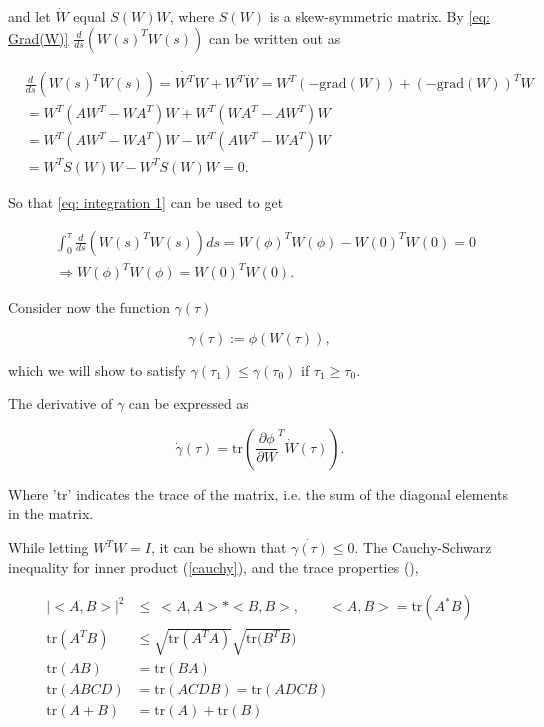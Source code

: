 and let $\dot{W}$ equal $S(W)W$, where $S(W)$ is a skew-symmetric matrix.
By \cref{eq: Grad(W)} $\frac{d}{ds} \left(W(s)^{T}W(s)\right)$ can be written out as 
 
 
\begin{equation}
 \label{eq: Div WtW}
 \begin{split}
  &\frac{d}{ds} (W(s)^{T}W(s))=\dot{W^{T}}W+W^{T}\dot{W}=W^{T}(-\text{grad}(W))+(-\text{grad}(W))^{T}W \\
  &=W^{T}(AW^{T}-WA^{T})W+W^{T}(WA^T-AW^T)W\\
  &=W^{T}(AW^{T}-WA^{T})W-W^{T}(AW^T-WA^{T})W\\
  &=W^{T}S(W)W-W^{T}S(W)W=0.
 \end{split}
\end{equation}

So that \cref{eq: integration 1} can be used to get
 
\begin{equation}
 \label{eq: Verifiy 1}
 \begin{split}
    &\int _{0}^{\tau} \frac{d}{ds} (W(s)^{T}W(s)) ds = W(\phi)^{T}W(\phi) - W(0)^{T}W(0) = 0 \\
    &\Longrightarrow W(\phi)^{T}W(\phi) = W(0)^{T}W(0).
  \end{split}
\end{equation}
 
Consider now the function $\gamma(\tau)$
 
 \begin{equation}
 \label{eq: gamma}
 \gamma(\tau):=\phi(W(\tau)),
 \end{equation}
 
which we will show to satisfy $\gamma(\tau_1) \leq \gamma(\tau_0)$ if $\tau_1 \geq \tau_0$. 

The derivative of $\gamma$ can be expressed as
 
  \label{eq: div gamma}
 \begin{equation}
  \dot{\gamma}(\tau)=\text{tr}(\frac{\partial \phi}{\partial W}^{T} \dot{W}(\tau)).
 \end{equation}
 
 Where 'tr' indicates the trace of the matrix, i.e. the sum of the diagonal elements in the matrix.
 
 While letting $W^{T}W=I$, it can be shown that $\dot{\gamma(\tau)} \leq 0$. 
 The Cauchy-Schwarz inequality for inner product (\cref{cauchy}), and the trace properties (),
 
\begin{align}
  |<A,B>|^{2}       &\leq \:<A,A>*<B,B>, \qquad <A,B> = \text{tr}(A^{*}B) \label{cauchy} \\
  \text{tr}(A^{T}B) &\leq \sqrt{\text{tr}(A^{T}A)}\sqrt{\text{tr}(B^{T}B}) \label{trace1} \\
  \text{tr}(AB)     &= \text{tr}(BA) \\
  \text{tr}(ABCD)   &= \text{tr}(ACDB) = \text{tr}(ADCB) \\  
  \text{tr}(A+B)    &= \text{tr}(A) + \text{tr}(B) \label{trace4}
\end{align}

